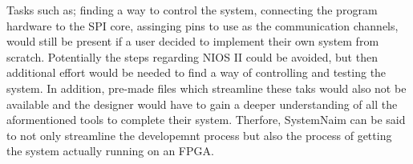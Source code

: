 Tasks such as; finding a way to control the system, connecting the program hardware to the SPI core, assinging pins to use as the communication channels, would still be present if a user decided to implement their own system from scratch. Potentially the steps regarding NIOS II could be avoided, but then additional effort would be needed to find a way of controlling and testing the system. In addition, pre-made files which streamline these taks would also not be available and the designer would have to gain a deeper understanding of all the aformentioned tools to complete their system. Therfore, SystemNaim can be said to not only streamline the developemnt process but also the process of getting the system actually running on an FPGA.







